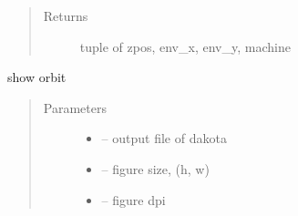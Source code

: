 \documentclass[letterpaper,10pt,english]{sphinxmanual}
\begin{document}
\begin{fulllineitems}
\begin{fulllineitems}
\begin{quote}
\begin{description}
\item[{Returns}] \leavevmode
tuple of zpos, env\_x, env\_y, machine

\end{description}\end{quote}

\end{fulllineitems}


\begin{fulllineitems}
\label{\detokenize{src/apidocs/dakopt:genopt.dakopt.DakotaOC.hcors}}
\end{fulllineitems}


\begin{fulllineitems}
\label{\detokenize{src/apidocs/dakopt:genopt.dakopt.DakotaOC.latfile}}
\end{fulllineitems}


\begin{fulllineitems}
\label{\detokenize{src/apidocs/dakopt:genopt.dakopt.DakotaOC.optdriver}}
\end{fulllineitems}


\begin{fulllineitems}
\label{\detokenize{src/apidocs/dakopt:genopt.dakopt.DakotaOC.plot}}
show orbit
\begin{quote}\begin{description}
\item[{Parameters}] \leavevmode\begin{itemize}
\item {} 
 -- output file of dakota

\item {} 
 -- figure size, (h, w)

\item {} 
 -- figure dpi

\end{itemize}


\end{description}
\end{quote}
\end{fulllineitems}
\end{fulllineitems}
\end{document}
